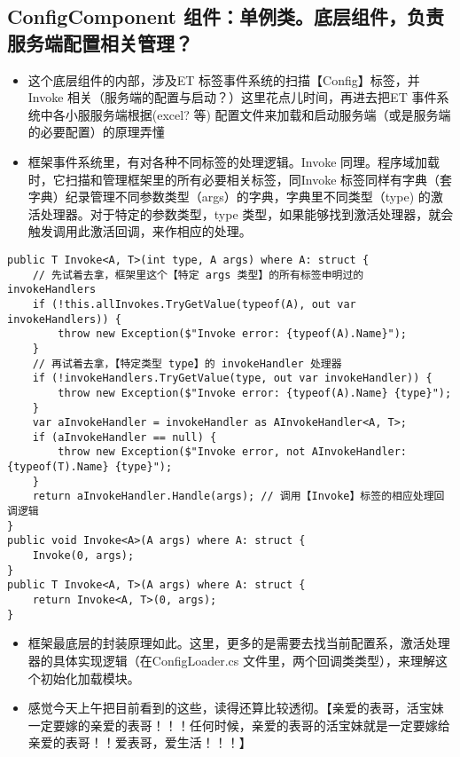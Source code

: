 \documentclass[9pt, b5paper]{article}
\begin{document}
\subsection{ConfigComponent 组件：单例类。底层组件，负责服务端配置相关管理？}
\label{sec-8-5}
\begin{itemize}
\item 这个底层组件的内部，涉及ET 标签事件系统的扫描【Config】标签，并Invoke 相关（服务端的配置与启动？）这里花点儿时间，再进去把ET 事件系统中各小服服务端根据(excel? 等) 配置文件来加载和启动服务端（或是服务端的必要配置）的原理弄懂
\item 框架事件系统里，有对各种不同标签的处理逻辑。Invoke 同理。程序域加载时，它扫描和管理框架里的所有必要相关标签，同Invoke 标签同样有字典（套字典）纪录管理不同参数类型（args）的字典，字典里不同类型（type) 的激活处理器。对于特定的参数类型，type 类型，如果能够找到激活处理器，就会触发调用此激活回调，来作相应的处理。
\end{itemize}
\begin{verbatim}
public T Invoke<A, T>(int type, A args) where A: struct {
    // 先试着去拿，框架里这个【特定 args 类型】的所有标签申明过的 invokeHandlers
    if (!this.allInvokes.TryGetValue(typeof(A), out var invokeHandlers)) {
        throw new Exception($"Invoke error: {typeof(A).Name}");
    }
    // 再试着去拿，【特定类型 type】的 invokeHandler 处理器
    if (!invokeHandlers.TryGetValue(type, out var invokeHandler)) {
        throw new Exception($"Invoke error: {typeof(A).Name} {type}");
    }
    var aInvokeHandler = invokeHandler as AInvokeHandler<A, T>;
    if (aInvokeHandler == null) {
        throw new Exception($"Invoke error, not AInvokeHandler: {typeof(T).Name} {type}");
    }
    return aInvokeHandler.Handle(args); // 调用【Invoke】标签的相应处理回调逻辑
}
public void Invoke<A>(A args) where A: struct {
    Invoke(0, args);
}
public T Invoke<A, T>(A args) where A: struct {
    return Invoke<A, T>(0, args);
}
\end{verbatim}
\begin{itemize}
\item 框架最底层的封装原理如此。这里，更多的是需要去找当前配置系，激活处理器的具体实现逻辑（在ConfigLoader.cs 文件里，两个回调类类型），来理解这个初始化加载模块。
\item 感觉今天上午把目前看到的这些，读得还算比较透彻。【亲爱的表哥，活宝妹一定要嫁的亲爱的表哥！！！任何时候，亲爱的表哥的活宝妹就是一定要嫁给亲爱的表哥！！爱表哥，爱生活！！！】
\end{itemize}
\end{document}
